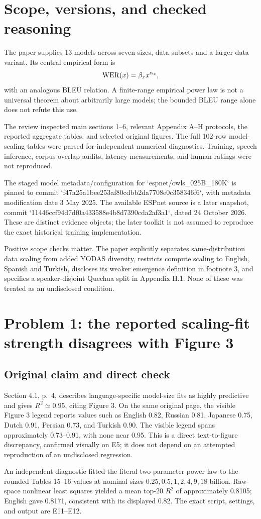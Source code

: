 \documentclass[10pt]{article}
\begin{document}
\section*{Scope, versions, and checked reasoning}
The paper supplies 13 models across seven sizes, data subsets and a larger-data variant. Its central empirical form is \[{\rm WER}(x)=\beta_x x^{\alpha_x},\] with an analogous BLEU relation. A finite-range empirical power law is not a universal theorem about arbitrarily large models; the bounded BLEU range alone does not refute this use.\par
The review inspected main sections 1–6, relevant Appendix A–H protocols, the reported aggregate tables, and selected original figures. The full 102-row model-scaling tables were parsed for independent numerical diagnostics. Training, speech inference, corpus overlap audits, latency measurements, and human ratings were not reproduced.\par
The staged model metadata/configuration for `espnet/owls\_025B\_180K` is pinned to commit `f47a25a1bee253af80cdbb2da7708e0c358346f6`, with metadata modification date 3 May 2025. The available ESPnet source is a later snapshot, commit `11446ccf94d7df0a433588e4b8d7390cda2af3a1`, dated 24 October 2026. These are distinct evidence objects; the later toolkit is not assumed to reproduce the exact historical training implementation.\par
Positive scope checks matter. The paper explicitly separates same-distribution data scaling from added YODAS diversity, restricts compute scaling to English, Spanish and Turkish, discloses its weaker emergence definition in footnote 3, and specifies a speaker-disjoint Quechua split in Appendix H.1. None of these was treated as an undisclosed condition.\par
\section*{Problem 1: the reported scaling-fit strength disagrees with Figure 3}
\subsection*{Original claim and direct check}
Section 4.1, p. 4, describes language-specific model-size fits as highly predictive and gives \(R^2\simeq0.95\), citing Figure 3. On the same original page, the visible Figure 3 legend reports values such as English 0.82, Russian 0.81, Japanese 0.75, Dutch 0.91, Persian 0.73, and Turkish 0.90. The visible legend spans approximately 0.73–0.91, with none near 0.95. This is a direct text-to-figure discrepancy, confirmed visually on E5; it does not depend on an attempted reproduction of an undisclosed regression.\par
An independent diagnostic fitted the literal two-parameter power law to the rounded Tables 15–16 values at nominal sizes \(0.25,0.5,1,2,4,9,18\) billion. Raw-space nonlinear least squares yielded a mean top-20 \(R^2\) of approximately 0.8105; English gave 0.8171, consistent with its displayed 0.82. The exact script, settings, and output are E11–E12.\par
\end{document}
